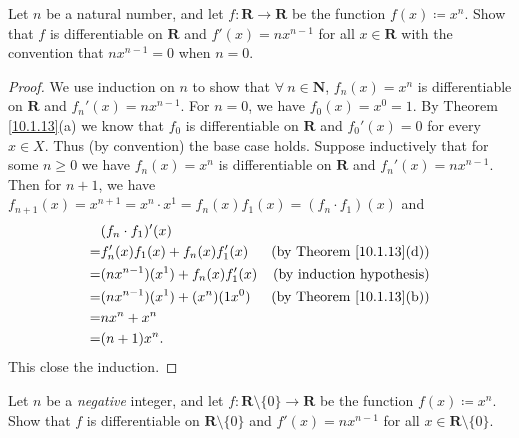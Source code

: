 \begin{exercise}\label{ex 10.1.5}
    Let \(n\) be a natural number, and let \(f : \mathbf{R} \to \mathbf{R}\) be the function \(f(x) \coloneqq x^n\).
    Show that \(f\) is differentiable on \(\mathbf{R}\) and \(f'(x) = n x^{n - 1}\) for all \(x \in \mathbf{R}\) with the convention that \(n x^{n - 1} = 0\) when \(n = 0\).
\end{exercise}

\begin{proof}
    We use induction on \(n\) to show that \(\forall\ n \in \mathbf{N}\), \(f_n(x) = x^n\) is differentiable on \(\mathbf{R}\) and \(f_n'(x) = n x^{n - 1}\).
    For \(n = 0\), we have \(f_0(x) = x^0 = 1\).
    By Theorem \ref{10.1.13}(a) we know that \(f_0\) is differentiable on \(\mathbf{R}\) and \(f_0'(x) = 0\) for every \(x \in X\).
    Thus (by convention) the base case holds.
    Suppose inductively that for some \(n \geq 0\) we have \(f_n(x) = x^n\) is differentiable on \(\mathbf{R}\) and \(f_n'(x) = n x^{n - 1}\).
    Then for \(n + 1\), we have \(f_{n + 1}(x) = x^{n + 1} = x^n \cdot x^1 = f_n(x) f_1(x) = (f_n \cdot f_1)(x)\) and
    \begin{align*}
          & (f_n \cdot f_1)'(x)                                                        \\
        = & f_n'(x) f_1(x) + f_n(x) f_1'(x)     & \text{(by Theorem \ref{10.1.13}(d))} \\
        = & (n x^{n - 1})(x^1) + f_n(x) f_1'(x) & \text{(by induction hypothesis)}     \\
        = & (n x^{n - 1})(x^1) + (x^n)(1 x^0)   & \text{(by Theorem \ref{10.1.13}(b))} \\
        = & n x^n + x^n                                                                \\
        = & (n + 1) x^n.
    \end{align*}
    This close the induction.
\end{proof}

\begin{exercise}\label{ex 10.1.6}
    Let \(n\) be a \emph{negative} integer, and let \(f : \mathbf{R} \setminus \{0\} \to \mathbf{R}\) be the function \(f(x) \coloneqq x^n\).
    Show that \(f\) is differentiable on \(\mathbf{R} \setminus \{0\}\) and \(f'(x) = n x^{n - 1}\) for all \(x \in \mathbf{R} \setminus \{0\}\).
\end{exercise}

